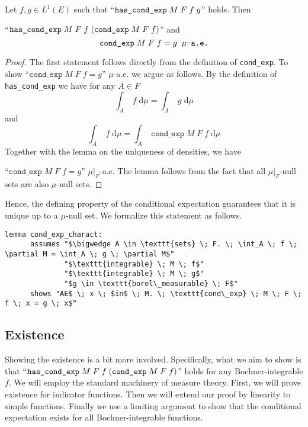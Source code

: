 \begin{lemma}
	Let $f, g \in L^1(E)$ such that ``$\normalfont\texttt{has\_cond\_exp} \; M \; F \; f \; g$'' holds. Then 
	\par\noindent ``$\normalfont\texttt{has\_cond\_exp} \; M \; F \; f \; (\texttt{cond\_exp} \; M \; F \; f)$'' and
	\[
		\normalfont\texttt{cond\_exp} \; M \; F \; f = g \;\; \mu\texttt{-a.e.}
	\]
\end{lemma}
\begin{proof}
	The first statement follows directly from the definition of \texttt{cond\_exp}. To show ``$\texttt{cond\_exp} \; M \; F \; f = g$'' $\mu$-a.e. we argue as follows. By the definition of \texttt{has\_cond\_exp} we have for any $A \in F$
	\[
		\int_A \; f \; \textrm{d}\mu = \int_A \; g \; \textrm{d}\mu
	\]
	and
	\[
		\int_A \; f \; \textrm{d}\mu = \int_A \; \texttt{cond\_exp} \; M \; F \; f \; \textrm{d}\mu
	\]
	Together with the lemma on the uniqueness of densities, we have 
	\par\noindent``$\texttt{cond\_exp} \; M \; F \; f = g$'' $\mu\vert_F$-a.e. The lemma follows from the fact that all $\mu\vert_F$-null sets are also $\mu$-null sets.
\end{proof}

Hence, the defining property of the conditional expectation guarantees that it is unique up to a $\mu$-null set. We formalize this statement as follows.

\begin{isalemma}
{\small
	\begin{lstlisting}[style=isabelle]
	lemma cond_exp_charact:
	  assumes "$\bigwedge A \in \texttt{sets} \; F. \; \int_A \; f \; \partial M = \int_A \; g \; \partial M$"
			  "$\texttt{integrable} \; M \; f$"
			  "$\texttt{integrable} \; M \; g$"
			  "$g \in \texttt{borel\_measurable} \; F$"
	  shows "AE$ \; x \; $in$ \; M. \; \texttt{cond\_exp} \; M \; F \; f \; x = g \; x$"
	\end{lstlisting}
}
\end{isalemma}

\subsection{Existence}

Showing the existence is a bit more involved. Specifically, what we aim to show is that ``$\normalfont\texttt{has\_cond\_exp} \; M \; F \; f \; (\texttt{cond\_exp} \; M \; F \; f)$'' holds for any Bochner-integrable $f$. We will employ the standard machinery of measure theory. First, we will prove existence for indicator functions. Then we will extend our proof by linearity to simple functions. Finally we use a limiting argument to show that the conditional expectation exists for all Bochner-integrable functions.

